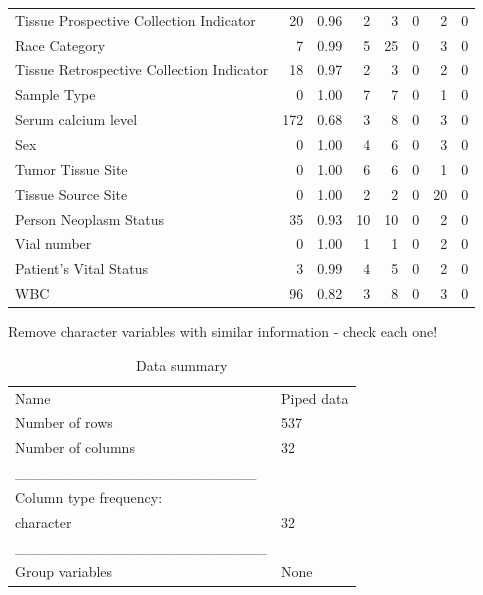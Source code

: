 \documentclass[]{article}
\newenvironment{Shaded}{\begin{snugshade}}{\end{snugshade}}
\newcommand{\KeywordTok}[1]{\textcolor[rgb]{0.13,0.29,0.53}{\textbf{#1}}}
\newcommand{\StringTok}[1]{\textcolor[rgb]{0.31,0.60,0.02}{#1}}
\newcommand{\OperatorTok}[1]{\textcolor[rgb]{0.81,0.36,0.00}{\textbf{#1}}}
\newcommand{\NormalTok}[1]{#1}
\begin{document}
\begin{longtable}[]{@{}lrrrrrrr@{}}
Tissue Prospective Collection Indicator & 20 & 0.96 & 2 & 3 & 0 & 2 &
0\tabularnewline
Race Category & 7 & 0.99 & 5 & 25 & 0 & 3 & 0\tabularnewline
Tissue Retrospective Collection Indicator & 18 & 0.97 & 2 & 3 & 0 & 2 &
0\tabularnewline
Sample Type & 0 & 1.00 & 7 & 7 & 0 & 1 & 0\tabularnewline
Serum calcium level & 172 & 0.68 & 3 & 8 & 0 & 3 & 0\tabularnewline
Sex & 0 & 1.00 & 4 & 6 & 0 & 3 & 0\tabularnewline
Tumor Tissue Site & 0 & 1.00 & 6 & 6 & 0 & 1 & 0\tabularnewline
Tissue Source Site & 0 & 1.00 & 2 & 2 & 0 & 20 & 0\tabularnewline
Person Neoplasm Status & 35 & 0.93 & 10 & 10 & 0 & 2 & 0\tabularnewline
Vial number & 0 & 1.00 & 1 & 1 & 0 & 2 & 0\tabularnewline
Patient's Vital Status & 3 & 0.99 & 4 & 5 & 0 & 2 & 0\tabularnewline
WBC & 96 & 0.82 & 3 & 8 & 0 & 3 & 0\tabularnewline
\bottomrule
\end{longtable}

\begin{Shaded}
\end{Shaded}

Remove character variables with similar information - check each one!

\begin{Shaded}
\end{Shaded}

\begin{longtable}[]{@{}ll@{}}
\caption{Data summary}\tabularnewline
\toprule
Name & Piped data\tabularnewline
Number of rows & 537\tabularnewline
Number of columns & 32\tabularnewline
\_\_\_\_\_\_\_\_\_\_\_\_\_\_\_\_\_\_\_\_\_\_\_ &\tabularnewline
Column type frequency: &\tabularnewline
character & 32\tabularnewline
\_\_\_\_\_\_\_\_\_\_\_\_\_\_\_\_\_\_\_\_\_\_\_\_ &\tabularnewline
Group variables & None\tabularnewline
\bottomrule
\end{longtable}
\end{document}
